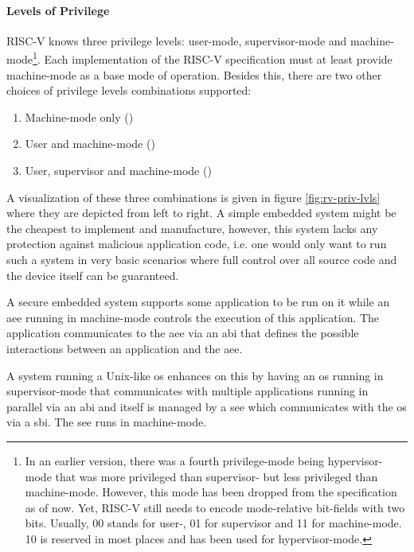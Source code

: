 \paragraph{Levels of Privilege}

RISC-V knows three privilege levels: user-mode, supervisor-mode and machine-mode\footnote{%
    In an earlier version, there was a fourth privilege-mode being hypervisor-mode that was more privileged than supervisor- but less privileged than machine-mode.
    However, this mode has been dropped from the specification as of now.
    Yet, RISC-V still needs to encode mode-relative bit-fields with two bits.
    Usually, 00 stands for user-, 01 for supervisor and 11 for machine-mode.
    10 is reserved in most places and has been used for hypervisor-mode.
}.
Each implementation of the RISC-V specification must at least provide machine-mode as a base mode of operation.
Besides this, there are two other choices of privilege levels combinations supported:
\begin{enumerate}
    \item Machine-mode only ()
    \item User and machine-mode ()
    \item User, supervisor and machine-mode ()
\end{enumerate}

A visualization of these three combinations is given in figure \ref{fig:rv-priv-lvls} where they are depicted from left to right.
A simple embedded system might be the cheapest to implement and manufacture, however, this system lacks any protection against malicious application code, i.e. one would only want to run such a system in very basic scenarios where full control over all source code and the device itself can be guaranteed.

A secure embedded system supports some application to be run on it while an \gls{aee} running in machine-mode controls the execution of this application.
The application communicates to the \gls{aee} via an \gls{abi} that defines the possible interactions between an application and the \gls{aee}.

A system running a Unix-like \gls{os} enhances on this by having an \gls{os} running in supervisor-mode that communicates with multiple applications running in parallel via an \gls{abi} and itself is managed by a \gls{see} which communicates with the \gls{os} via a \gls{sbi}.
The \gls{see} runs in machine-mode.

